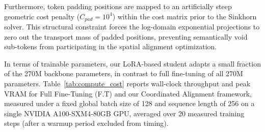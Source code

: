 \documentclass[11pt]{article}
\begin{document}
Furthermore, token padding positions are mapped to an artificially steep geometric cost penalty ($C_{pad} = 10^4$) within the cost matrix prior to the Sinkhorn solver. This structural constraint forces the log-domain exponential projections to zero out the transport mass of padded positions, preventing semantically void sub-tokens from participating in the spatial alignment optimization. 

In terms of trainable parameters, our LoRA-based student adapts a small fraction of the 270M backbone parameters, in contrast to full fine-tuning of all 270M parameters. Table~\ref{tab:compute_cost} reports wall-clock throughput and peak VRAM for Full Fine-Tuning (F.T) and our Coordinated Alignment framework, measured under a fixed global batch size of 128 and sequence length of 256 on a single NVIDIA A100-SXM4-80GB GPU, averaged over 20 measured training steps (after a warmup period excluded from timing).

\begin{table}[t]
\centering
\small
{}
\caption{Computational cost profile (mean $\pm$ SD over 20 measured steps, batch size 128, sequence length 256, single A100-80GB GPU) for all four external baselines and our framework, alongside Full Fine-Tuning, all measured under the identical protocol.}
\label{tab:compute_cost}
\end{table}
\end{document}
